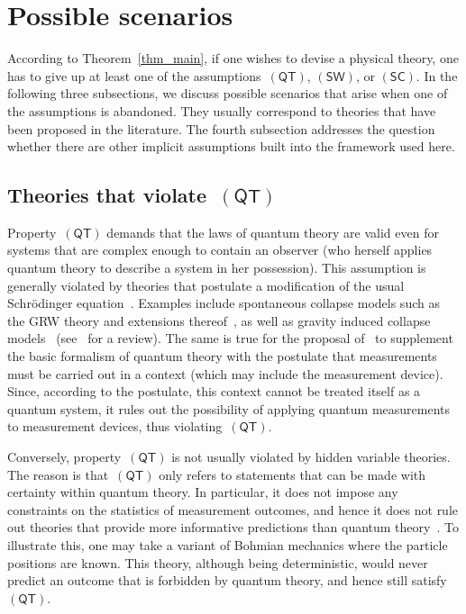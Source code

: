 \documentclass{article}
\theoremstyle{plain}
\theoremstyle{definition}
\newcommand*{\QT}{\mathsf{(QT)}}
\newcommand*{\SW}{\mathsf{(SW)}}
\newcommand*{\SelfCons}{\mathsf{(SC)}}
\begin{document}
\section{Possible scenarios} \label{sec_discussion}

According to Theorem~\ref{thm_main}, if one wishes to devise a physical theory, one has to give up at least one of the assumptions~$\QT$, $\SW$, or $\SelfCons$.  In the following three subsections, we discuss possible scenarios that arise when one of the assumptions is abandoned. They usually correspond to theories that have been proposed in the literature. The fourth subsection addresses the question whether there are other implicit assumptions built into the framework used here. 


\subsection{Theories that violate~$\QT$} \label{sec_vQT}

Property~$\QT$ demands that the laws of quantum theory are valid even for systems that are complex enough to contain an observer (who herself applies quantum theory to describe a system in her possession). This assumption is generally violated by theories that postulate a modification of the usual Schr\"odinger equation~\cite{GisRig95,Weinberg12}. Examples include spontaneous collapse models such as the GRW theory and extensions thereof~\cite{GhRiWe86,Pearle89,Tumulka06}, as well as gravity induced collapse models~\cite{Karolyhazy66,Diosi89,Penrose96} (see~\cite{Bassietal13} for a review). The same is true for the proposal of~\cite{AufGra15} to supplement the basic formalism of quantum theory with the postulate that measurements must be carried out in a context (which may include the measurement device). Since, according to the postulate, this context cannot be treated itself as a quantum system, it rules out the possibility of applying quantum measurements to measurement devices, thus violating~$\QT$. 




Conversely, property~$\QT$ is not usually violated by hidden variable theories. The reason is that~$\QT$ only refers to statements that can be made with certainty within quantum theory. In particular, it does not impose any constraints on the statistics of measurement outcomes, and hence it does not rule out theories that provide more informative predictions than quantum theory~\cite{ColRen11}.  To illustrate this, one may take a variant of Bohmian mechanics where the particle positions are known. This theory, although being deterministic, would never predict an outcome that is forbidden by quantum theory, and hence still satisfy~$\QT$.
\end{document}
